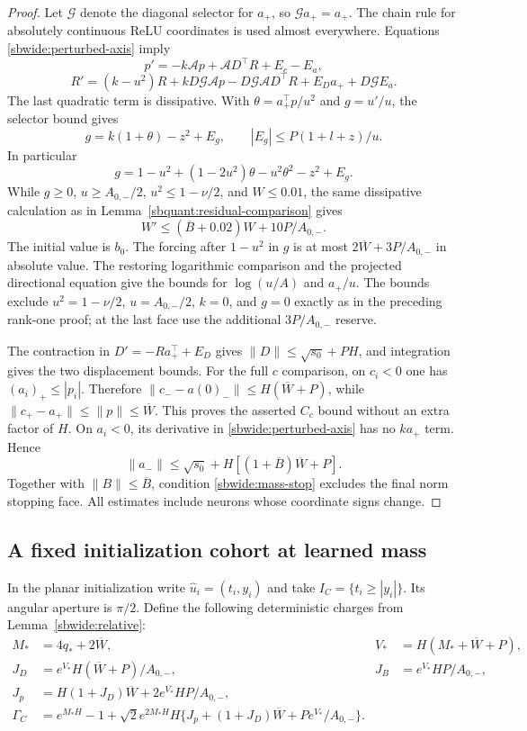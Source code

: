 \documentclass{article} %
\theoremstyle{plain}
\theoremstyle{definition}
\theoremstyle{remark}
\begin{document}
\begin{proof}
Let $\mathcal G$ denote the diagonal selector for $a_+$, so
$\mathcal G a_+=a_+$. The chain rule for absolutely continuous ReLU
coordinates is used almost everywhere. Equations
\eqref{sbwide:perturbed-axis} imply
\[
 p'=-k\mathcal A p+\mathcal A D^\top R+E_c-E_a,
\]
\[
 R'=(k-u^2)R+kD\mathcal G\mathcal A p
 -D\mathcal G\mathcal A D^\top R+E_Da_++D\mathcal G E_a.
\]
The last quadratic term is dissipative. With
$\theta=a_+^\top p/u^2$ and $g=u'/u$, the selector bound gives
\[
 g=k(1+\theta)-z^2+E_g,
 \qquad |E_g|\le P(1+l+z)/u.
\]
In particular
\[
 g=1-u^2+(1-2u^2)\theta-u^2\theta^2-z^2+E_g.
\]
While $g\ge0$, $u\ge A_{0,-}/2$, $u^2\le1-\nu/2$, and
$W\le0.01$, the same dissipative calculation as in
Lemma~\ref{sbquant:residual-comparison} gives
\[
 W'\le(\overline B+0.02)W+10P/A_{0,-}.
\]
The initial value is $b_0$. The forcing after $1-u^2$ in $g$ is at most
$2\overline W+3P/A_{0,-}$ in absolute value. The restoring logarithmic
comparison and the projected directional equation give the bounds for
$\log(u/A)$ and $a_+/u$.
The bounds exclude $u^2=1-\nu/2$, $u=A_{0,-}/2$, $k=0$, and $g=0$
exactly as in the preceding rank-one proof; at the last face use the
additional $3P/A_{0,-}$ reserve.

The contraction in $D'=-Ra_+^\top+E_D$ gives
$\|D\|\le\sqrt{s_0}+PH$, and integration gives the two displacement
bounds. For the full $c$ comparison, on $c_i<0$ one has
$(a_i)_+\le|p_i|$. Therefore
$\|c_- -a(0)_-\|\le H(\overline W+P)$, while
$\|c_+-a_+\|\le\|p\|\le\overline W$.
This proves the asserted $C_c$ bound without an extra factor of $H$.
On $a_i<0$, its derivative in \eqref{sbwide:perturbed-axis} has no
$ka_+$ term. Hence
\[
 \|a_-\|\le\sqrt{s_0}+H[(1+\overline B)\overline W+P].
\]
Together with $\|B\|\le\overline B$, condition
\eqref{sbwide:mass-stop} excludes the final norm stopping face.
All estimates include neurons whose coordinate signs change.
\end{proof}

\subsection{A fixed initialization cohort at learned mass}

In the planar initialization write $\widehat u_i=(t_i,y_i)$ and take
$I_C=\{t_i\ge|y_i|\}$. Its angular aperture is $\pi/2$.
Define the following deterministic charges from Lemma~\ref{sbwide:relative}:
\begin{align*}
 M_*&=4q_*+2\overline W,& V_*&=H(M_*+\overline W+P),\\
 J_D&=e^{V_*}H(\overline W+P)/A_{0,-},&
 J_B&=e^{V_*}HP/A_{0,-},\\
 J_p&=H(1+J_D)\overline W+2e^{V_*}HP/A_{0,-},\\
 \Gamma_C&=e^{M_*H}-1+
 \sqrt2e^{2M_*H}H\{J_p+(1+J_D)\overline W+Pe^{V_*}/A_{0,-}\}.
\end{align*}
\end{document}

